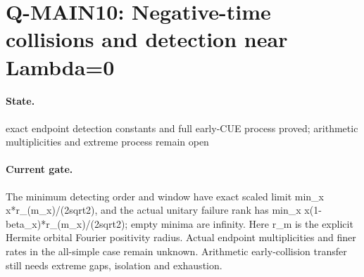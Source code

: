 \section{Q-MAIN10: Negative-time collisions and detection near Lambda=0}
\paragraph{State.} exact endpoint detection constants and full early-CUE process proved; arithmetic multiplicities and extreme process remain open
\paragraph{Current gate.} The minimum detecting order and window have exact scaled limit min\_x x*r\_(m\_x)/(2sqrt2), and the actual unitary failure rank has min\_x x(1-beta\_x)*r\_(m\_x)/(2sqrt2); empty minima are infinity. Here r\_m is the explicit Hermite orbital Fourier positivity radius. Actual endpoint multiplicities and finer rates in the all-simple case remain unknown. Arithmetic early-collision transfer still needs extreme gaps, isolation and exhaustion.
